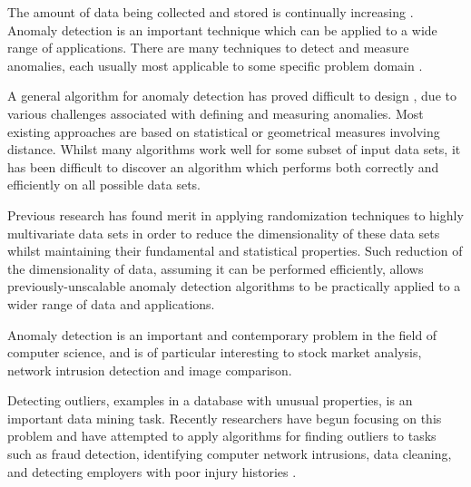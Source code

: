 The amount of data being collected and stored is continually increasing
\cite{Vries:2010}. Anomaly detection is an important technique which can be
applied to a wide range of applications. There are many techniques to detect and
measure anomalies, each usually most applicable to some specific problem domain
\citeNeeded{}.

A general algorithm for anomaly detection has proved difficult to design
\citeNeeded{}, due to various challenges associated with defining and measuring
anomalies. Most existing approaches are based on statistical or geometrical
measures involving distance. Whilst many algorithms work well for some subset of
input data sets, it has been difficult to discover an algorithm which performs
both correctly and efficiently on all possible data sets.

Previous research has found merit in applying randomization techniques to highly
multivariate data sets in order to reduce the dimensionality of these data sets
whilst maintaining their fundamental and statistical properties. Such reduction
of the dimensionality of data, assuming it can be performed efficiently, allows
previously-unscalable anomaly detection algorithms to be practically applied to
a wider range of data and applications.

Anomaly detection is an important and contemporary problem in the field of
computer science, and is of particular interesting to stock market analysis,
network intrusion detection and image comparison.

Detecting outliers, examples in a database with unusual properties, is an important data mining task. Recently researchers have begun focusing on this problem and have attempted to apply algorithms for finding outliers to tasks such as fraud detection, identifying computer network intrusions, data cleaning, and detecting employers with poor injury histories \cite{Bay:2003}.